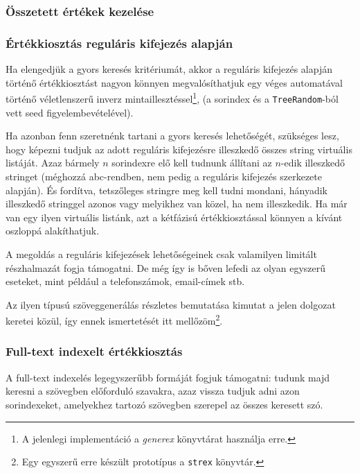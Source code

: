 \documentclass[
    parspace,
    noindent,
    nohyp,
]{elteiktdk}[2023/04/10]
\begin{document}
\subsubsection{Összetett értékek kezelése}


\subsubsection{Értékkiosztás reguláris kifejezés alapján}

Ha elengedjük a gyors keresés kritériumát,
akkor a reguláris kifejezés alapján történő értékkiosztást nagyon könnyen megvalósíthatjuk
egy véges automatával történő véletlenszerű inverz mintaillesztéssel\footnote{
  A jelenlegi implementáció a \textit{generex} könyvtárat használja erre.
},
(a sorindex és a \texttt{TreeRandom}-ból vett seed figyelembevételével).

Ha azonban fenn szeretnénk tartani a gyors keresés lehetőségét,
szükséges lesz, hogy képezni tudjuk az adott reguláris kifejezésre illeszkedő összes string virtuális listáját.
Azaz bármely $n$ sorindexre elő kell tudnunk állítani az $n$-edik illeszkedő stringet
(méghozzá abc-rendben, nem pedig a reguláris kifejezés szerkezete alapján).
És fordítva, tetszőleges stringre meg kell tudni mondani,
hányadik illeszkedő stringgel azonos vagy melyikhez van közel, ha nem illeszkedik.
Ha már van egy ilyen virtuális listánk, azt a kétfázisú értékkiosztással könnyen a kívánt oszloppá alakíthatjuk.

A megoldás a reguláris kifejezések lehetőségeinek csak valamilyen limitált részhalmazát fogja támogatni.
De még így is bőven lefedi az olyan egyszerű eseteket, mint például a telefonszámok, email-címek stb.

Az ilyen típusú szöveggenerálás részletes bemutatása kimutat a jelen dolgozat keretei közül,
így ennek ismertetését itt mellőzöm\footnote{
  Egy egyszerű erre készült prototípus a \texttt{strex} könyvtár.
}.

\subsubsection{Full-text indexelt értékkiosztás}

A full-text indexelés legegyszerűbb formáját fogjuk támogatni:
tudunk majd keresni a szövegben előforduló szavakra,
azaz vissza tudjuk adni azon sorindexeket,
amelyekhez tartozó szövegben szerepel az összes keresett szó.
\end{document}
